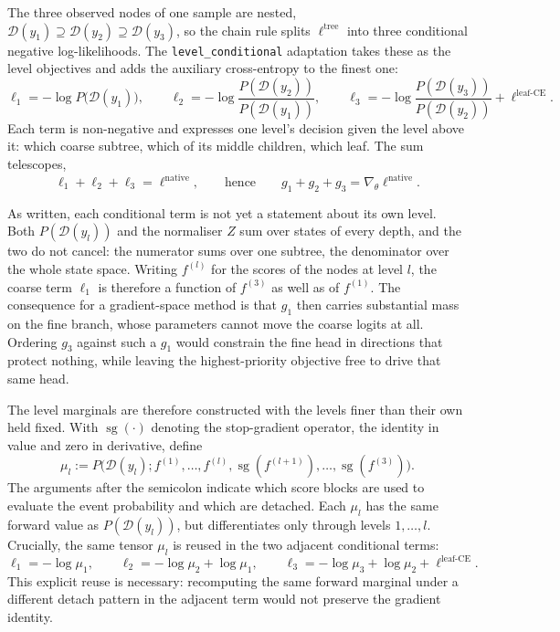 The three observed nodes of one sample are nested,
$\mathcal{D}(y_1)\supseteq\mathcal{D}(y_2)\supseteq\mathcal{D}(y_3)$, so the
chain rule splits $\ell^{\mathrm{tree}}$ into three conditional negative
log-likelihoods. The \texttt{level\_conditional} adaptation takes these as the
level objectives and adds the auxiliary cross-entropy to the finest one:
\[
\ell_1=-\log P\big(\mathcal{D}(y_1)\big),\qquad
\ell_2=-\log \frac{P(\mathcal{D}(y_2))}{P(\mathcal{D}(y_1))},\qquad
\ell_3=-\log \frac{P(\mathcal{D}(y_3))}{P(\mathcal{D}(y_2))}
+\ell^{\mathrm{leaf\text{-}CE}}.
\]
Each term is non-negative and expresses one level's decision given the level
above it: which coarse subtree, which of its middle children, which leaf. The
sum telescopes,
\[
\ell_1+\ell_2+\ell_3=\ell^{\mathrm{native}},
\qquad\text{hence}\qquad
g_1+g_2+g_3=\nabla_\theta\ell^{\mathrm{native}} .
\]

As written, each conditional term is not yet a statement about its own level.
Both $P(\mathcal{D}(y_l))$ and the normaliser $Z$ sum over states of every
depth, and the two do not cancel: the numerator sums over one subtree, the
denominator over the whole state space. Writing $f^{(l)}$ for the scores of the
nodes at level $l$, the coarse term $\ell_1$ is therefore a function of
$f^{(3)}$ as well as of $f^{(1)}$. The consequence for a gradient-space method
is that $g_1$
then carries substantial mass on the fine branch, whose parameters cannot move
the coarse logits at all. Ordering $g_3$ against such a $g_1$ would constrain
the fine head in directions that protect nothing, while leaving the
highest-priority objective free to drive that same head.

The level marginals are therefore constructed with the levels finer than their
own held fixed. With $\operatorname{sg}(\cdot)$ denoting the stop-gradient
operator, the identity in value and zero in derivative, define
\[
\mu_l
:=
P\bigl(\mathcal{D}(y_l);
f^{(1)},\dots,f^{(l)},
\operatorname{sg}(f^{(l+1)}),\dots,
\operatorname{sg}(f^{(3)})\bigr).
\]
The arguments after the semicolon indicate which score blocks are used to
evaluate the event probability and which are detached. Each $\mu_l$ has the same
forward value as $P(\mathcal{D}(y_l))$, but differentiates only through levels
$1,\dots,l$. Crucially, the same tensor $\mu_l$ is reused in the two adjacent
conditional terms:
\[
\ell_1=-\log\mu_1,\qquad
\ell_2=-\log\mu_2+\log\mu_1,\qquad
\ell_3=-\log\mu_3+\log\mu_2
+\ell^{\mathrm{leaf\text{-}CE}}.
\]
This explicit reuse is necessary: recomputing the same forward marginal under a
different detach pattern in the adjacent term would not preserve the gradient
identity.

